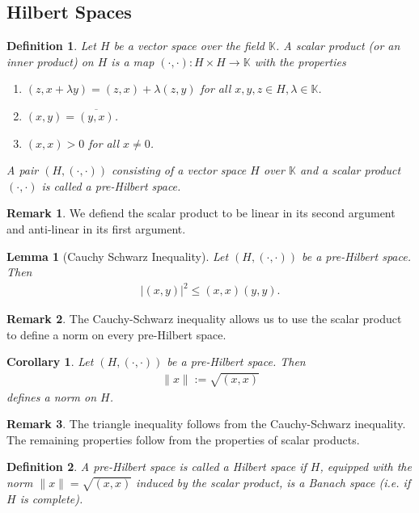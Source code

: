 \documentclass[11pt,a4paper]{article}
\newtheorem{lem}{Lemma}[section]
\newtheorem{cor}{Corollary}[section]
\newtheorem{defn}{Definition}[section]
\theoremstyle{definition}
\newtheorem{rem}{Remark}[section]
\begin{document}
\subsection{Hilbert Spaces}
\begin{defn} Let $H$ be a vector space over the field $\mathbb{K}$. A scalar product (or an inner product) on $H$ is a map $(\cdot, \cdot) : H \times H \to \mathbb{K}$ with the properties 
\begin{enumerate}
\item $(z,x+ \lambda y)= (z,x) + \lambda(z,y)$ for all $x,y,z \in H, \lambda \in \mathbb{K}$.
\item $(x,y)= \overline{(y,x)}$.
\item $(x,x)>0$ for all $x \neq 0$.
\end{enumerate}
A pair $(H, ( \cdot, \cdot))$ consisting of a vector space $H$ over $\mathbb{K}$ and a scalar product $( \cdot, \cdot)$ is called a pre-Hilbert space. 
\end{defn}
\begin{rem} We defiend the scalar product to be linear in its second argument and anti-linear in its first argument. 
\end{rem}
\newpage
\begin{lem}[Cauchy Schwarz Inequality] Let $(H,( \cdot, \cdot))$ be a pre-Hilbert space. Then 
\begin{align*}
|(x,y)|^2 \leq (x,x) (y,y). 
\end{align*}
\end{lem}
\begin{rem} The Cauchy-Schwarz inequality allows us to use the scalar product to define a norm on every pre-Hilbert space. 
\end{rem}
\begin{cor} Let $(H, ( \cdot, \cdot))$ be a pre-Hilbert space. Then 
\begin{align*}
\|x\|:= \sqrt{(x,x)}
\end{align*}
defines a norm on $H$. 
\end{cor}
\begin{rem} The triangle inequality follows from the Cauchy-Schwarz inequality. The remaining properties follow from the properties of scalar products. 
\end{rem}
\begin{defn} A pre-Hilbert space is called a Hilbert space if $H$, equipped with the norm $\|x \| = \sqrt{(x,x)}$ induced by the scalar product, is a Banach space (i.e. if $H$ is complete). 
\end{defn}
\end{document}
